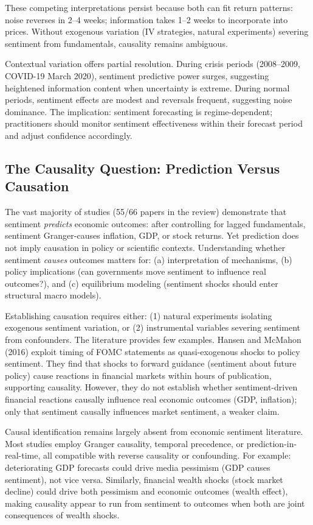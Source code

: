 These competing interpretations persist because both can fit return patterns: noise reverses in 2--4 weeks; information takes 1--2 weeks to incorporate into prices. Without exogenous variation (IV strategies, natural experiments) severing sentiment from fundamentals, causality remains ambiguous.

Contextual variation offers partial resolution. During crisis periods (2008--2009, COVID-19 March 2020), sentiment predictive power surges, suggesting heightened information content when uncertainty is extreme. During normal periods, sentiment effects are modest and reversals frequent, suggesting noise dominance. The implication: sentiment forecasting is regime-dependent; practitioners should monitor sentiment effectiveness within their forecast period and adjust confidence accordingly.

\subsection{The Causality Question: Prediction Versus Causation}

The vast majority of studies (55/66 papers in the review) demonstrate that sentiment \emph{predicts} economic outcomes: after controlling for lagged fundamentals, sentiment Granger-causes inflation, GDP, or stock returns. Yet prediction does not imply causation in policy or scientific contexts. Understanding whether sentiment \emph{causes} outcomes matters for: (a) interpretation of mechanisms, (b) policy implications (can governments move sentiment to influence real outcomes?), and (c) equilibrium modeling (sentiment shocks should enter structural macro models).

Establishing causation requires either: (1) natural experiments isolating exogenous sentiment variation, or (2) instrumental variables severing sentiment from confounders. The literature provides few examples. Hansen and McMahon (2016) exploit timing of FOMC statements as quasi-exogenous shocks to policy sentiment. They find that shocks to forward guidance (sentiment about future policy) cause reactions in financial markets within hours of publication, supporting causality. However, they do not establish whether sentiment-driven financial reactions causally influence real economic outcomes (GDP, inflation); only that sentiment causally influences market sentiment, a weaker claim.

Causal identification remains largely absent from economic sentiment literature. Most studies employ Granger causality, temporal precedence, or prediction-in-real-time, all compatible with reverse causality or confounding. For example: deteriorating GDP forecasts could drive media pessimism (GDP causes sentiment), not vice versa. Similarly, financial wealth shocks (stock market decline) could drive both pessimism and economic outcomes (wealth effect), making causality appear to run from sentiment to outcomes when both are joint consequences of wealth shocks.

